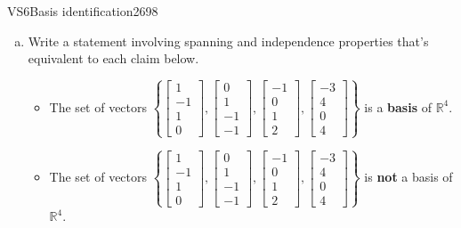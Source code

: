 \begin{exercise}{VS6}{Basis identification}{2698} 
\begin{exerciseStatement} 

\begin{enumerate}[(a)]
\item  

 Write a statement involving spanning and independence properties that's equivalent to each claim below. 

 

\begin{itemize}
\item  

 The set of vectors \(\left\{ \left[\begin{array}{c}
1 \\
-1 \\
1 \\
0
\end{array}\right] , \left[\begin{array}{c}
0 \\
1 \\
-1 \\
-1
\end{array}\right] , \left[\begin{array}{c}
-1 \\
0 \\
1 \\
2
\end{array}\right] , \left[\begin{array}{c}
-3 \\
4 \\
0 \\
4
\end{array}\right] \right\}\) is a \textbf{basis} of \(\mathbb{R}^4\). 

 
\item  

 The set of vectors \(\left\{ \left[\begin{array}{c}
1 \\
-1 \\
1 \\
0
\end{array}\right] , \left[\begin{array}{c}
0 \\
1 \\
-1 \\
-1
\end{array}\right] , \left[\begin{array}{c}
-1 \\
0 \\
1 \\
2
\end{array}\right] , \left[\begin{array}{c}
-3 \\
4 \\
0 \\
4
\end{array}\right] \right\}\) is \textbf{not} a basis of \(\mathbb{R}^4\). 


\end{itemize}
\end{enumerate}
\end{exerciseStatement}
\end{exercise}
